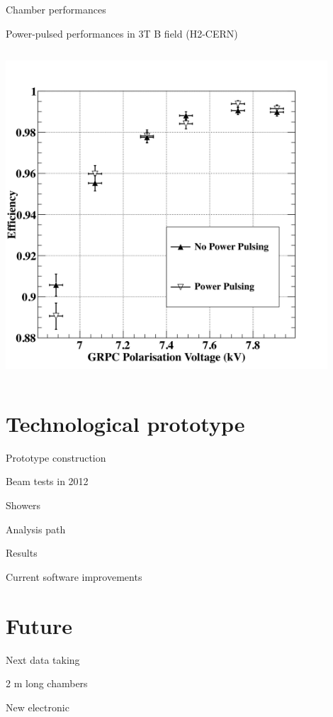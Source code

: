 \documentclass[10pt]{beamer}
\begin{document}
\begin{frame}{Chamber performances  }
\begin{block}{Power-pulsed performances in 3T B field (H2-CERN)}
\begin{columns}
      \begin{column}{0.5\textwidth}
        \centerline{\includegraphics[width=0.9\textwidth]{jpg/PowerPulsingHvScan}}
      \end{column}
    \end{columns}
\end{block}

\end{frame}
\section{ Technological prototype}
\begin{frame}{Prototype construction}
\end{frame}

\begin{frame}{Beam tests in 2012}
\end{frame}

\begin{frame}{Showers}
\end{frame}

\begin{frame}{Analysis path}
\end{frame}
\begin{frame}{Results}
\end{frame}

\begin{frame}{Current software improvements}
\end{frame}

\section{Future}

\begin{frame}{Next data taking}
\end{frame}

\begin{frame}{2 m long chambers}
\end{frame}

\begin{frame}{ New electronic}
\end{frame}
\end{document}
